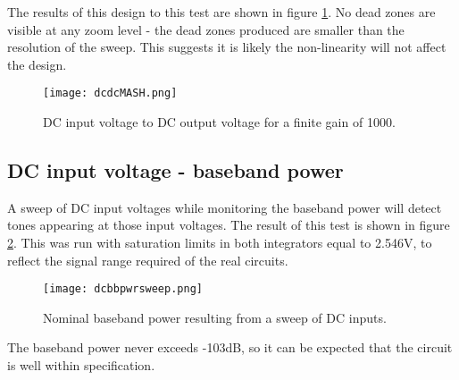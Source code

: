         The results of this design to this test are shown in figure \ref{fig:dcdc}.
        No dead zones are visible at any zoom level - the dead zones produced are smaller than the resolution of the sweep.
        This suggests it is likely the non-linearity will not affect the design.

        \begin{figure}[hb]
            \begin{center}
            \texttt{[image: dcdcMASH.png]}
            \caption{DC input voltage to DC output voltage for a finite gain of 1000.} 
            \label{fig:dcdc}
            \end{center}
        \end{figure}       

        \subsection{DC input voltage - baseband power}
        \label{Verification:DCbbpwr}
        A sweep of DC input voltages while monitoring the baseband power will detect tones appearing at those input voltages.
        The result of this test is shown in figure \ref{fig:dcdcbbpwr}.
        This was run with saturation limits in both integrators equal to 2.546V, to reflect the signal range required of the real circuits.

         \begin{figure}
            \begin{center}
            \texttt{[image: dcbbpwrsweep.png]}
            \caption{Nominal baseband power resulting from a sweep of DC inputs.}
            \label{fig:dcdcbbpwr}
            \end{center}
        \end{figure}       
        
        The baseband power never exceeds -103dB, so it can be expected that the circuit is well within specification.


